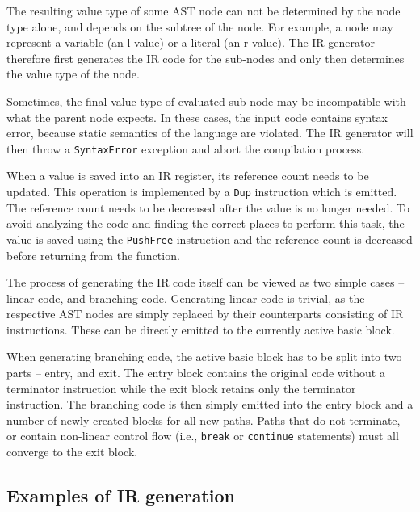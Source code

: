 The resulting value type of some AST node can not be determined by the node type alone, and depends on the subtree of the node. For example, a \nonterminal[PrimaryExpression]{}{} node may represent a variable (an l-value) or a literal (an r-value). The IR generator therefore first generates the IR code for the sub-nodes and only then determines the value type of the node.

Sometimes, the final value type of evaluated sub-node may be incompatible with what the parent node expects. In these cases, the input code contains syntax error, because static semantics of the language are violated. The IR generator will then throw a \texttt{SyntaxError} exception and abort the compilation process.

When a value is saved into an IR register, its reference count needs to be updated. This operation is implemented by a \texttt{Dup} instruction which is emitted. The reference count needs to be decreased after the value is no longer needed. To avoid analyzing the code and finding the correct places to perform this task, the value is saved using the \texttt{PushFree} instruction and the reference count is decreased before returning from the function.

The process of generating the IR code itself can be viewed as two simple cases -- linear code, and branching code. Generating linear code is trivial, as the respective AST nodes are simply replaced by their counterparts consisting of IR instructions. These can be directly emitted to the currently active basic block.

When generating branching code, the active basic block has to be split into two parts -- entry, and exit. The entry block contains the original code without a terminator instruction while the exit block retains only the terminator instruction. The branching code is then simply emitted into the entry block and a number of newly created blocks for all new paths. Paths that do not terminate, or contain non-linear control flow (i.e., \texttt{break} or \texttt{continue} statements) must all converge to the exit block.

\subsection{Examples of IR generation}


